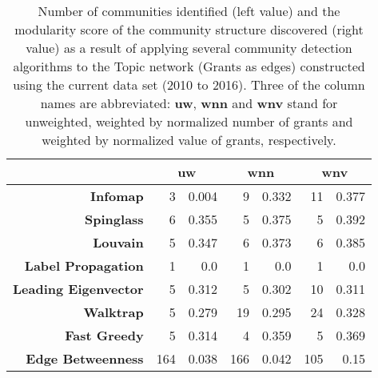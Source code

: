 \begin{table}[!htbp]
\centering
\caption[Number of communities and modularity score of community structure identified within the Topic network (Grants as edges) constructed using the current data set (2010 to 2016)]{Number of communities identified (left value) and the modularity score of the community structure discovered (right value) as a result of applying several community detection algorithms to the Topic network (Grants as edges) constructed using the current data set (2010 to 2016). Three of the column names are abbreviated: \textbf{uw}, \textbf{wnn} and \textbf{wnv} stand for unweighted, weighted by normalized number of grants and weighted by normalized value of grants, respectively.}
\label{table:topic_a_current_modularity_appendix}
\begin{tabular}{r|rr|rr|rr}
\textbf{} & \multicolumn{2}{c|}{\textbf{uw}} & \multicolumn{2}{c|}{\textbf{wnn}} & \multicolumn{2}{c}{\textbf{wnv}}\\
\hline
\textbf{Infomap}             & {3}   & {0.004} & {9}   & {0.332} & {11}  & {0.377}\\
\textbf{Spinglass}           & {6}   & {0.355} & {5}   & {0.375} & {5}   & {0.392}\\
\textbf{Louvain}             & {5}   & {0.347} & {6}   & {0.373} & {6}   & {0.385}\\
\textbf{Label Propagation}   & {1}   & {0.0}   & {1}   & {0.0}   & {1}   & {0.0}\\
\textbf{Leading Eigenvector} & {5}   & {0.312} & {5}   & {0.302} & {10}  & {0.311}\\
\textbf{Walktrap}            & {5}   & {0.279} & {19}  & {0.295} & {24}  & {0.328}\\
\textbf{Fast Greedy}         & {5}   & {0.314} & {4}   & {0.359} & {5}   & {0.369}\\
\textbf{Edge Betweenness}    & {164} & {0.038} & {166} & {0.042} & {105} & {0.15}
\end{tabular}
\end{table}

